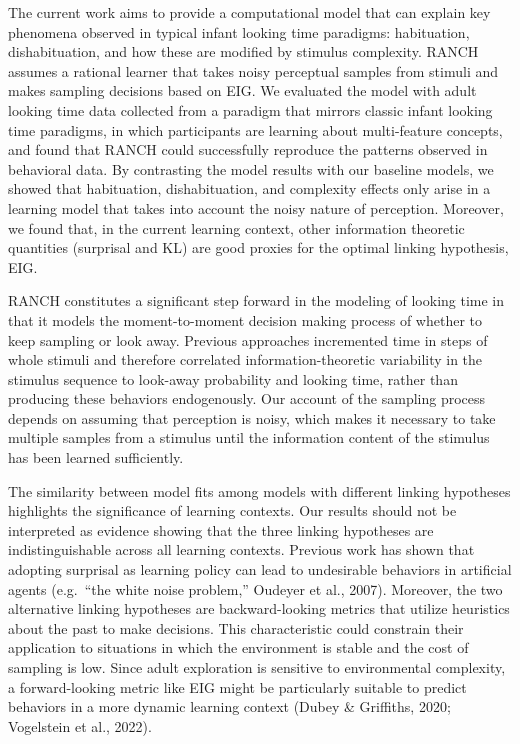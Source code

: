 \documentclass[10pt, letterpaper]{article}
\begin{document}
The current work aims to provide a computational model that can explain
key phenomena observed in typical infant looking time paradigms:
habituation, dishabituation, and how these are modified by stimulus
complexity. RANCH assumes a rational learner that takes noisy perceptual
samples from stimuli and makes sampling decisions based on EIG. We
evaluated the model with adult looking time data collected from a
paradigm that mirrors classic infant looking time paradigms, in which
participants are learning about multi-feature concepts, and found that
RANCH could successfully reproduce the patterns observed in behavioral
data. By contrasting the model results with our baseline models, we
showed that habituation, dishabituation, and complexity effects only
arise in a learning model that takes into account the noisy nature of
perception. Moreover, we found that, in the current learning context,
other information theoretic quantities (surprisal and KL) are good
proxies for the optimal linking hypothesis, EIG.

RANCH constitutes a significant step forward in the modeling of looking
time in that it models the moment-to-moment decision making process of
whether to keep sampling or look away. Previous approaches incremented
time in steps of whole stimuli and therefore correlated
information-theoretic variability in the stimulus sequence to look-away
probability and looking time, rather than producing these behaviors
endogenously. Our account of the sampling process depends on assuming
that perception is noisy, which makes it necessary to take multiple
samples from a stimulus until the information content of the stimulus
has been learned sufficiently.

The similarity between model fits among models with different linking
hypotheses highlights the significance of learning contexts. Our results
should not be interpreted as evidence showing that the three linking
hypotheses are indistinguishable across all learning contexts. Previous
work has shown that adopting surprisal as learning policy can lead to
undesirable behaviors in artificial agents (e.g.~``the white noise
problem,'' Oudeyer et al., 2007). Moreover, the two alternative linking
hypotheses are backward-looking metrics that utilize heuristics about
the past to make decisions. This characteristic could constrain their
application to situations in which the environment is stable and the
cost of sampling is low. Since adult exploration is sensitive to
environmental complexity, a forward-looking metric like EIG might be
particularly suitable to predict behaviors in a more dynamic learning
context (Dubey \& Griffiths, 2020; Vogelstein et al., 2022).
\end{document}
